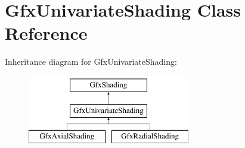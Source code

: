 \hypertarget{class_gfx_univariate_shading}{}\section{Gfx\+Univariate\+Shading Class Reference}
\label{class_gfx_univariate_shading}
Inheritance diagram for Gfx\+Univariate\+Shading\+:\begin{figure}[H]
\begin{center}
\leavevmode
\includegraphics[height=3.000000cm]{class_gfx_univariate_shading}
\end{center}
\end{figure}
